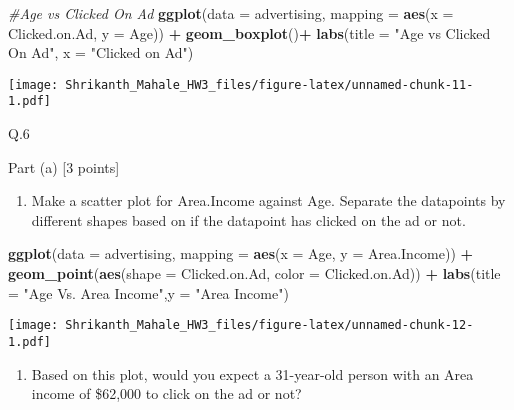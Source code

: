 \documentclass[]{article}
\newenvironment{Shaded}{\begin{snugshade}}{\end{snugshade}}
\newcommand{\KeywordTok}[1]{\textcolor[rgb]{0.13,0.29,0.53}{\textbf{#1}}}
\newcommand{\DataTypeTok}[1]{\textcolor[rgb]{0.13,0.29,0.53}{#1}}
\newcommand{\StringTok}[1]{\textcolor[rgb]{0.31,0.60,0.02}{#1}}
\newcommand{\CommentTok}[1]{\textcolor[rgb]{0.56,0.35,0.01}{\textit{#1}}}
\newcommand{\OperatorTok}[1]{\textcolor[rgb]{0.81,0.36,0.00}{\textbf{#1}}}
\newcommand{\NormalTok}[1]{#1}
\providecommand{\tightlist}{%
  \setlength{\itemsep}{0pt}\setlength{\parskip}{0pt}}
\begin{document}
\begin{Shaded}
\begin{Highlighting}[]
\CommentTok{#Age vs Clicked On Ad}
\KeywordTok{ggplot}\NormalTok{(}\DataTypeTok{data =}\NormalTok{ advertising, }\DataTypeTok{mapping =} \KeywordTok{aes}\NormalTok{(}\DataTypeTok{x =}\NormalTok{ Clicked.on.Ad, }\DataTypeTok{y =}\NormalTok{ Age)) }\OperatorTok{+}\StringTok{ }\KeywordTok{geom_boxplot}\NormalTok{()}\OperatorTok{+}\StringTok{ }\KeywordTok{labs}\NormalTok{(}\DataTypeTok{title =} \StringTok{"Age vs Clicked On Ad"}\NormalTok{, }\DataTypeTok{x =} \StringTok{"Clicked on Ad"}\NormalTok{)}
\end{Highlighting}
\end{Shaded}

\texttt{[image: Shrikanth\_Mahale\_HW3\_files/figure-latex/unnamed-chunk-11-1.pdf]}

Q.6

Part (a) {[}3 points{]}

\begin{enumerate}
\def\labelenumi{\arabic{enumi}.}
\tightlist
\item
  Make a scatter plot for Area.Income against Age. Separate the
  datapoints by different shapes based on if the datapoint has clicked
  on the ad or not.
\end{enumerate}

\begin{Shaded}
\begin{Highlighting}[]
\KeywordTok{ggplot}\NormalTok{(}\DataTypeTok{data =}\NormalTok{ advertising, }\DataTypeTok{mapping =} \KeywordTok{aes}\NormalTok{(}\DataTypeTok{x =}\NormalTok{ Age, }\DataTypeTok{y =}\NormalTok{ Area.Income)) }\OperatorTok{+}\StringTok{ }\KeywordTok{geom_point}\NormalTok{(}\KeywordTok{aes}\NormalTok{(}\DataTypeTok{shape =}\NormalTok{ Clicked.on.Ad, }\DataTypeTok{color =}\NormalTok{ Clicked.on.Ad))  }\OperatorTok{+}\StringTok{ }\KeywordTok{labs}\NormalTok{(}\DataTypeTok{title =} \StringTok{"Age Vs. Area Income"}\NormalTok{,}\DataTypeTok{y =} \StringTok{"Area Income"}\NormalTok{)}
\end{Highlighting}
\end{Shaded}

\texttt{[image: Shrikanth\_Mahale\_HW3\_files/figure-latex/unnamed-chunk-12-1.pdf]}

\begin{enumerate}
\def\labelenumi{\arabic{enumi}.}
\setcounter{enumi}{1}
\tightlist
\item
  Based on this plot, would you expect a 31-year-old person with an Area
  income of \$62,000 to click on the ad or not?
\end{enumerate}
\end{document}
